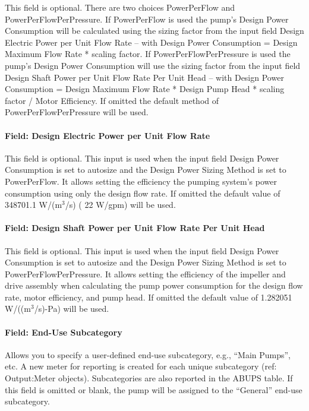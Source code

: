 This field is optional. There are two choices PowerPerFlow and PowerPerFlowPerPressure. If PowerPerFlow is used the pump's Design Power Consumption will be calculated using the sizing factor from the input field Design Electric Power per Unit Flow Rate -- with Design Power Consumption = Design Maximum Flow Rate * scaling factor. If PowerPerFlowPerPressure is used the pump's Design Power Consumption will use the sizing factor from the input field Design Shaft Power per Unit Flow Rate Per Unit Head -- with Design Power Consumption = Design Maximum Flow Rate * Design Pump Head * scaling factor / Motor Efficiency. If omitted the default method of PowerPerFlowPerPressure will be used.

\paragraph{Field: Design Electric Power per Unit Flow Rate}\label{field-design-electric-power-per-unit-flow-rate-1}

This field is optional. This input is used when the input field Design Power Consumption is set to autosize and the Design Power Sizing Method is set to PowerPerFlow. It allows setting the efficiency the pumping system's power consumption using only the design flow rate. If omitted the default value of 348701.1 W/(m\(^{3}\)/s) ( 22 W/gpm) will be used.

\paragraph{Field: Design Shaft Power per Unit Flow Rate Per Unit Head}\label{field-design-shaft-power-per-unit-flow-rate-per-unit-head-2}

This field is optional. This input is used when the input field Design Power Consumption is set to autosize and the Design Power Sizing Method is set to PowerPerFlowPerPressure. It allows setting the efficiency of the impeller and drive assembly when calculating the pump power consumption for the design flow rate, motor efficiency, and pump head. If omitted the default value of 1.282051 W/((m\(^{3}\)/s)-Pa) will be used.

\paragraph{Field: End-Use Subcategory}\label{field-end-use-subcategory-3-000}

Allows you to specify a user-defined end-use subcategory, e.g., ``Main Pumps'', etc. A new meter for reporting is created for each unique subcategory (ref: Output:Meter objects). Subcategories are also reported in the ABUPS table. If this field is omitted or blank, the pump will be assigned to the ``General'' end-use subcategory.

